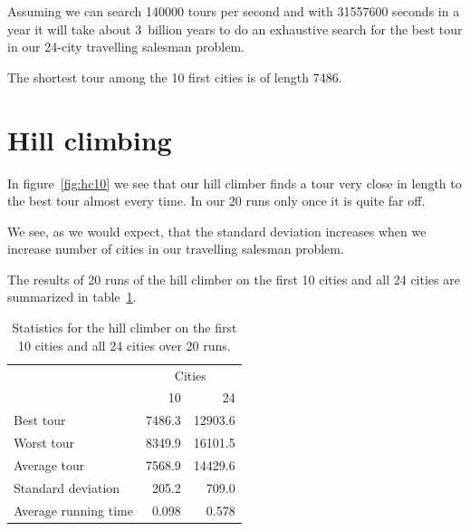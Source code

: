 \documentclass[a4paper]{article}
\begin{document}
Assuming we can search 140000 tours per second and with 31557600 seconds
in a year it will take about 3~billion years to do an exhaustive search
for the best tour in our 24-city travelling salesman problem.

The shortest tour among the 10 first cities is of length 7486.

\newpage

\section*{Hill climbing}

In figure~\ref{fig:hc10} we see that our hill climber finds a tour very close
in length to the best tour almost every time. In our 20 runs only once it is
quite far off.

We see, as we would expect, that the standard deviation increases when we increase number of
cities in our travelling salesman problem.

The results of 20 runs of the hill climber on the first 10 cities and
all 24 cities are summarized in table~\ref{tab:hc}.

\begin{table}[h]
  \centering
  \begin{tabular}{lrr}
    & \multicolumn{2}{c}{Cities} \\
    & 10 & 24 \\
    \hline
    Best tour & 7486.3 & 12903.6 \\
    Worst tour & 8349.9 & 16101.5 \\
    Average tour & 7568.9 & 14429.6 \\
    Standard deviation & 205.2 & 709.0 \\
    Average running time & 0.098 & 0.578 \\
  \end{tabular}
  \caption{Statistics for the hill climber on
    the first 10 cities and all 24 cities over 20 runs.}
  \label{tab:hc}
\end{table}
\end{document}
